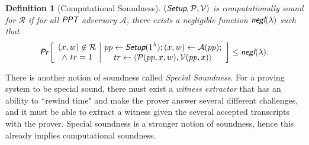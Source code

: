 \documentclass{article}
\theoremstyle{plain}
\newtheorem{definition}{Definition}[section]
\theoremstyle{remark}
\begin{document}
\begin{definition}[Computational Soundness]
$(\emph{\textsf{Setup}}, \mathcal{P}, \mathcal{V})$ is computationally sound for $\mathcal{R}$ if for all $\emph{\textsf{PPT}}$ adversary $\mathcal{A}$, there exists a negligible function $\emph{\textsf{negl}}(\lambda)$ such that
\begin{align*}
\emph{\textsf{Pr}}\left[
\begin{array}{c|c}
    \begin{gathered}
        (x,w)\not\in\mathcal{R}\\
        \wedge\ tr=1
    \end{gathered}
    &
    \begin{gathered}
        pp\leftarrow\emph{\textsf{Setup}}(1^{\lambda}); (x, w)\leftarrow\mathcal{A}(pp); \\
        tr\leftarrow\langle\mathcal{P}(pp,x,w), \mathcal{V}(pp,x)\rangle
    \end{gathered}
\end{array}
\right]
\le \emph{\textsf{negl}}(\lambda).
\end{align*}
\end{definition}

There is another notion of soundness called \textit{Special Soundness}. For a proving system to be special sound, there must exist a \textit{witness extractor} that has an ability to ``rewind time" and make the prover answer several different challenges, and it must be able to extract a witness given the several accepted transcripts with the prover. Special soundness is a stronger notion of soundness, hence this already implies computational soundness.
\end{document}
